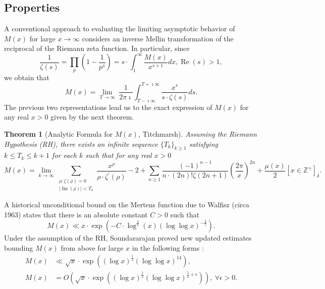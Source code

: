 \documentclass[11pt,reqno,a4letter]{article}
\numberwithin{figure}{section}
\numberwithin{table}{section}
\newcommand{\Iverson}[1]{\ensuremath{\left[#1\right]_{\delta}}}
\theoremstyle{plain}
\newtheorem{theorem}{Theorem}
\numberwithin{theorem}{section}
\theoremstyle{definition}
\renewcommand{\Re}{\operatorname{Re}}
\renewcommand{\Im}{\operatorname{Im}}
\begin{document}
\subsection{Properties} 
\label{subSection_Intro_Mx_properties} 

A conventional approach to evaluating the limiting asymptotic 
behavior of $M(x)$ for large $x \rightarrow \infty$ considers an 
inverse Mellin transformation of the reciprocal of the Riemann zeta function. 
In particular, since 
\[
\frac{1}{\zeta(s)} = \prod_{p} \left(1 - \frac{1}{p^s}\right) = 
     s \cdot \int_1^{\infty} \frac{M(x)}{x^{s+1}} dx, \Re(s) > 1, 
\]
we obtain that 
\[
M(x) = \lim_{T \rightarrow \infty}\ \frac{1}{2\pi\imath} \int_{T-\imath\infty}^{T+\imath\infty} 
     \frac{x^s}{s \cdot \zeta(s)} ds. 
\] 
The previous two representations lead us to the 
exact expression of $M(x)$ for any real $x > 0$ 
given by the next theorem. 
\nocite{TITCHMARSH} 

\begin{theorem}[Analytic Formula for $M(x)$, Titchmarsh] 
\label{theorem_MxMellinTransformInvFormula} 
Assuming the Riemann Hypothesis (RH), there exists an infinite sequence 
$\{T_k\}_{k \geq 1}$ satisfying $k \leq T_k \leq k+1$ for each $k$ 
such that for any real $x > 0$ 
\[
M(x) = \lim_{k \rightarrow \infty} 
     \sum_{\substack{\rho: \zeta(\rho) = 0 \\ |\Im(\rho)| < T_k}} 
     \frac{x^{\rho}}{\rho \cdot \zeta^{\prime}(\rho)} - 2 + 
     \sum_{n \geq 1} \frac{(-1)^{n-1}}{n \cdot (2n)! \zeta(2n+1)} 
     \left(\frac{2\pi}{x}\right)^{2n} + 
     \frac{\mu(x)}{2} \Iverson{x \in \mathbb{Z}^{+}}. 
\] 
\end{theorem} 

A historical unconditional bound on the Mertens function due to Walfisz (circa 1963) 
states that there is an absolute constant $C > 0$ such that 
$$M(x) \ll x \cdot \exp\left(-C \cdot \log^{\frac{3}{5}}(x) 
  (\log\log x)^{-\frac{3}{5}}\right).$$ 
Under the assumption of the RH, Soundararajan proved new updated estimates 
bounding $M(x)$ from above for large $x$ in the following forms \cite{SOUND-MERTENS-ANNALS}: 
\begin{align*} 
M(x) & \ll \sqrt{x} \cdot \exp\left((\log x)^{\frac{1}{2}} (\log\log x)^{14}\right), \\ 
M(x) & = O\left(\sqrt{x} \cdot \exp\left( 
     (\log x)^{\frac{1}{2}} (\log\log x)^{\frac{5}{2}+\epsilon}\right)\right),\ 
     \forall \epsilon > 0. 
\end{align*} 
\end{document}
